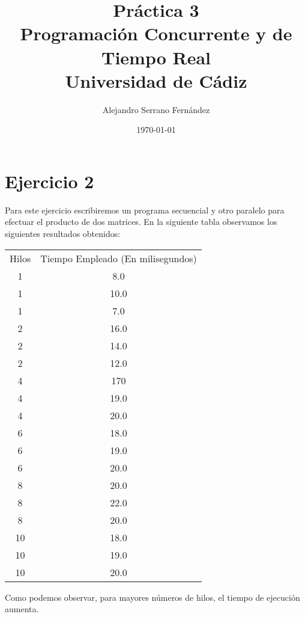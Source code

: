 \documentclass{article}
\title{Práctica 3 \\ Programación Concurrente y de Tiempo Real \\Universidad de Cádiz} %
\author{Alejandro Serrano Fernández} %
\date{\today} %
\begin{document}
\maketitle %



\section{Ejercicio 2}
Para este ejercicio escribiremos un programa secuencial y otro paralelo para efectuar el producto de dos matrices. En la siguiente tabla observamos los siguientes resultados obtenidos:

\hfill \break
\begin{center}
 \begin{tabular}{| c | c |}
 	Hilos & Tiempo Empleado (En milisegundos)\\
 	1 & 8.0 \\
 	1 & 10.0 \\
 	1 & 7.0 \\
 	2 & 16.0 \\
 	2 & 14.0 \\
 	2 & 12.0 \\
 	4 & 170 \\
 	4 & 19.0 \\
 	4 & 20.0 \\
 	6 & 18.0 \\
 	6 & 19.0 \\
 	6 & 20.0 \\
 	8 & 20.0 \\
 	8 & 22.0 \\
 	8 & 20.0 \\
 	10 & 18.0 \\
 	10 & 19.0 \\
 	10 & 20.0 \\
 \end{tabular}
\end{center}
\hfill \break
Como podemos observar, para mayores números de hilos, el tiempo de ejecución aumenta.
\end{document}
